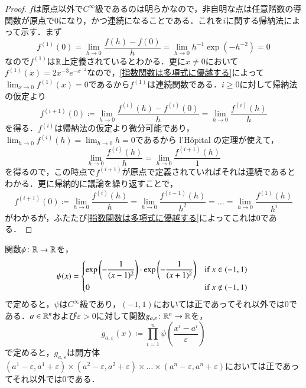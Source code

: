 \begin{proof}
$f$は原点以外で$C^\infty$級であるのは明らかなので，非自明な点は任意階数の導関数が原点で0になり，かつ連続になることである．これを$i$に関する帰納法によって示す．まず
\begin{equation}
f^{(1)}(0) = \lim_{h \to 0} \frac{f(h)-f(0)}{h} = \lim_{h \to 0} h^{-1} \exp(-h^{-2})=0
\end{equation}なので$f^{(1)}$は$\mathbb{R}$上定義されているとわかる．更に$x \neq 0$において$f^{(1)}(x) = 2x^{-3} e^{-x^{-2}}$なので，\cref{指数関数は多項式に優越する}によって$\lim_{x \to 0} f^{(1)}(x) = 0$であるから$f^{(1)}$は連続関数である．$i \geq 0$に対して帰納法の仮定より
\begin{equation}
f^{(i+1)}(0) \coloneqq \lim_{h\to 0 } \frac{f^{(i)}(h) - f^{(i)}(0)}{h} = \lim_{h\to 0}\frac{f^{(i)}(h)}{h}
\end{equation}を得る．$f^{(i)}$は帰納法の仮定より微分可能であり，$\lim_{h \to 0} f^{(i)}(h) = \lim_{h \to 0}h =0$であるから l'H\^opital の定理が使えて，
\begin{equation}
\lim_{h\to 0}\frac{f^{(i)}(h)}{h} = \lim_{h\to 0}\frac{f^{(i+1)}(h)}{1}
\end{equation}を得るので，この時点で$f^{(i+1)}$が原点で定義されていればそれは連続であるとわかる．更に帰納的に議論を繰り返すことで，
\begin{equation}
f^{(i+1)}(0) \coloneqq \lim_{h\to 0}\frac{f^{(i)}(h)}{h}  = \lim_{h\to 0}\frac{f^{(i-1)}(h)}{h^2} = \dots = \lim_{h\to 0}\frac{f^{(1)}(h)}{h^i}
\end{equation}がわかるが，ふたたび\cref{指数関数は多項式に優越する}によってこれは0である．
\end{proof}


\begin{prop}\label{開方体上の隆起関数}
関数$\psi \colon \mathbb{R} \to \mathbb{R}$を，
\begin{equation}
\psi(x) =   \begin{dcases*}
    \exp\left(-\frac{1}{(x-1)^2}\right) \cdot \exp\left(-\frac{1}{(x+1)^2}\right)  & if $x \in (-1,1)$ \\
    0 & if $x \notin (-1,1)$
  \end{dcases*}
\end{equation}
で定めると，$\psi$は$C^\infty$級であり，$(-1,1)$においては正であってそれ以外では0である．$a \in \mathbb{R}^n$および$\varepsilon > 0$に対して関数$g_{a,\varepsilon} \colon \mathbb{R}^n \to \mathbb{R}$を，
\begin{equation}
g_{a,\varepsilon}(x) \coloneqq \prod_{i=1}^n \psi\left( \frac{x^i - a^i}{\varepsilon} \right)
\end{equation}で定めると，$g_{a,\varepsilon}$は開方体$(a^1- \varepsilon, a^1 + \varepsilon) \times(a^2- \varepsilon, a^2 + \varepsilon) \times \dots \times (a^n- \varepsilon, a^n + \varepsilon)$においては正であってそれ以外では0である．
\end{prop}

